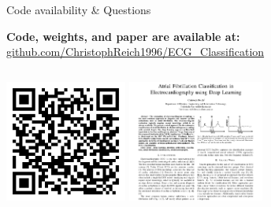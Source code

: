 \documentclass[
	english,
	aspectratio=169,
	color={accentcolor=10b},
	logo=true,
	colorframetitle=false,
	]{tudabeamer}
\begin{document}
    \begin{frame}[c]{Code availability \& Questions}
        \begin{center}
            \begin{large}
                \textbf{Code, weights, and paper are available at:}
                \href{https://github.com/ChristophReich1996/ECG_Classification}{github.com/ChristophReich1996/ECG\_Classification}
            \end{large}
        \end{center}
        \begin{columns}
                \centering
                \includegraphics[height=4cm]{artwork/qr-code.png}
                \centering
                \includegraphics[height=4cm]{artwork/paper.png}
        \end{columns} 
    \end{frame}
    
    
\end{document}
